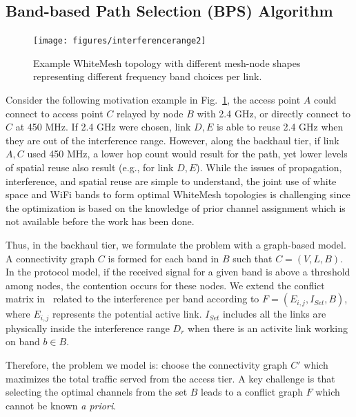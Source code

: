 \subsection{Band-based Path Selection (BPS) Algorithm}
\label{subsec:BPS}

\begin{figure}
\vspace{-0.0in}
\centering
\texttt{[image: figures/interferencerange2]}
\vspace{-0.1in}
\caption{Example WhiteMesh topology with different mesh-node shapes 
representing different frequency band choices per link.}
\label{fig:interferencerange}
\vspace{-0.1in}
\end{figure}

Consider the following motivation example in Fig.~\ref{fig:interferencerange}, the access point $A$ could connect to access point $C$ 
relayed by node $B$ with 2.4 GHz, or directly connect to $C$ at 450 MHz. If 2.4 GHz were 
chosen, link $D,E$ is able to reuse 2.4 GHz when they are out of the interference range. 
However, along the backhaul tier, if link $A,C$ used 450 MHz, a lower hop count would 
result for the path, yet lower levels of spatial reuse also result (e.g., for link $D,E$). 
While the issues of propagation, interference, and spatial reuse are simple to understand, 
the joint use of white space and WiFi bands to form optimal WhiteMesh topologies is 
challenging since the optimization is based on the knowledge of prior channel assignment 
which is not available before the work has been done.

Thus, in the backhaul tier, we formulate the problem with a graph-based model. A connectivity 
graph $C$ is formed for each band in $B$ such that $C=(V,L,B)$. 
In the protocol model, if the received signal for a given band is above a threshold among 
nodes, the contention occurs for these nodes. 
We extend the conflict matrix in~\cite{tang2005interference} related to the interference per band according to 
$F=(E_{i,j},I_{Set},B)$, where $E_{i,j}$ represents the potential active link. 
$I_{Set}$ includes all the links are physically inside the interference range 
$D_r$ when there is an activite link working on band $b \in B$.

Therefore, the problem we model is: choose the connectivity graph $C'$ which maximizes the total traffic served 
from the access tier. A key challenge is that selecting the optimal channels from the 
set $B$ leads to a conflict graph $F$ which cannot be known {\it a priori}. 

